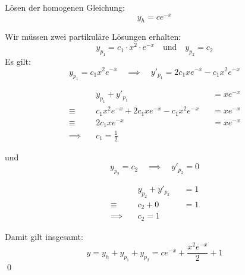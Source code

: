 \documentclass[answers]{exam}
\begin{document}
\begin{questions}
\begin{solution}
        Lösen der homogenen Gleichung:
        $$
            y_h = ce^{-x}
        $$

        Wir müssen zwei partikuläre Lösungen erhalten:
        $$
            y_{p_1} = c_1 \cdot x^2 \cdot e^{-x} \quad \text{und} \quad y_{p_2} = c_2
        $$
        Es gilt:
        $$
            y_{p_1} = c_1 x^2  e^{-x} \quad \implies \quad y'_{p_1} = 2c_1xe^{-x} - c_1x^2e^{-x}
        $$

        $$
            \begin{aligned}
                               & y_{p_1} + y'_{p_1}                          &  & = xe^{-x} \\
                \equiv \quad   & c_1 x^2 e^{-x} + 2c_1xe^{-x} - c_1x^2e^{-x} &  & = xe^{-x} \\
                \equiv \quad   & 2c_1xe^{-x}                                 &  & = xe^{-x} \\
                \implies \quad & c_1 = \frac{1}{2}
            \end{aligned}
        $$

        und
        $$
            y_{p_2} = c_2 \quad \implies \quad y'_{p_2} = 0
        $$

        $$
            \begin{aligned}
                               & y_{p_2} + y'_{p_2} &  & = 1 \\
                \equiv \quad   & c_2 + 0            &  & = 1 \\
                \implies \quad & c_2 = 1
            \end{aligned}
        $$

        Damit gilt insgesamt:
        $$
            y = y_h + y_{p_1} + y_{p_2} = ce^{-x} + \frac{x^2e^{-x}}{2} + 1
        $$\qed
    \end{solution}
\end{questions}
\end{document}
